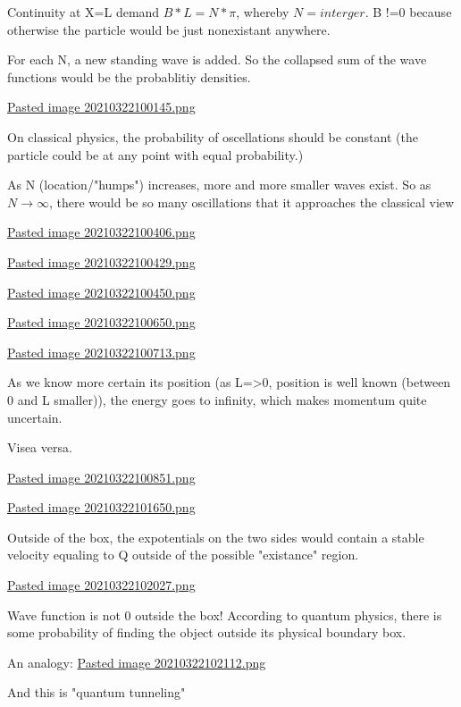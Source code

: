 \documentclass[letterpaper]{article}
\begin{document}
Continuity at X=L demand \(B*L = N*\pi\), whereby \(N=interger\). B !=0
because otherwise the particle would be just nonexistant anywhere.

For each N, a new standing wave is added. So the collapsed sum of the
wave functions would be the probablitiy densities.

\href{Pasted image 20210322100145.png.org}{Pasted image
20210322100145.png}

On classical physics, the probability of oscellations should be constant
(the particle could be at any point with equal probability.)

As N (location/"humps") increases, more and more smaller waves exist. So
as \(N\rightarrow \infty\), there would be so many oscillations that it
approaches the classical view

\href{Pasted image 20210322100406.png.org}{Pasted image
20210322100406.png}

\href{Pasted image 20210322100429.png.org}{Pasted image
20210322100429.png}

\href{Pasted image 20210322100450.png.org}{Pasted image
20210322100450.png}

\href{Pasted image 20210322100650.png.org}{Pasted image
20210322100650.png}

\href{Pasted image 20210322100713.png.org}{Pasted image
20210322100713.png}

As we know more certain its position (as L=>0, position is well known
(between 0 and L smaller)), the energy goes to infinity, which makes
momentum quite uncertain.

Visea versa.

\href{Pasted image 20210322100851.png.org}{Pasted image
20210322100851.png}

\href{Pasted image 20210322101650.png.org}{Pasted image
20210322101650.png}

Outside of the box, the expotentials on the two sides would contain a
stable velocity equaling to Q outside of the possible "existance"
region.

\href{Pasted image 20210322102027.png.org}{Pasted image
20210322102027.png}

Wave function is not 0 outside the box! According to quantum physics,
there is some probability of finding the object outside its physical
boundary box.

An analogy: \href{Pasted image 20210322102112.png.org}{Pasted image
20210322102112.png}

And this is "quantum tunneling"
\end{document}
